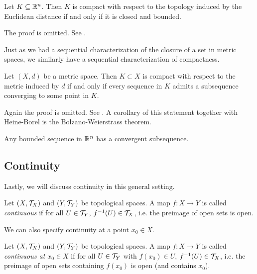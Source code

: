 \documentclass{article}
\begin{document}
\begin{theorem}
Let $K\subseteq {\mathbb{R}}^n$. Then $K$ is compact with respect to the topology induced by the Euclidean distance if and only if it is closed and bounded.
\end{theorem}

The proof is omitted. See \cite[Corollary 2.5.12]{tastetopology}.

Just as we had a sequential characterization of the closure of a set in metric spaces, we similarly have a sequential characterization of compactness. 

\begin{theorem}
Let $(X,d)$ be a metric space. Then $K\subset X$ is compact with respect to the metric induced by $d$ if and only if every sequence in $K$ admits a subsequence converging to some point in $K$.
\end{theorem}

Again the proof is omitted. See \cite[Theorem 2.5.10]{tastetopology}. A corollary of this statement together with Heine-Borel is the Bolzano-Weierstrass theorem.

\begin{corollary}
Any bounded sequence in ${\mathbb{R}}^n$ has a convergent subsequence.
\end{corollary}

\subsection{Continuity}

Lastly, we will discuss continuity in this general setting. 

\begin{definition}
Let $(X,\mathcal{T}_X)$ and $(Y,\mathcal{T}_Y)$ be topological spaces. A map $f\colon X \to Y$ is called \emph{continuous} if for all $U\in \mathcal{T}_Y$, $f^{-1}(U)\in \mathcal{T}_X$, i.e. the preimage of open sets is open. 
\end{definition}

We can also specify continuity at a point $x_0\in X$.

\begin{definition}
Let $(X,\mathcal{T}_X)$ and $(Y,\mathcal{T}_Y)$ be topological spaces. A map $f\colon X \to Y$ is called \emph{continuous at $x_0\in X$} if for all $U\in \mathcal{T}_Y$ with $f(x_0)\in U$, $f^{-1}(U)\in \mathcal{T}_X$, i.e. the preimage of open sets containing $f(x_0)$ is open (and contains $x_0$).
\end{definition}
\end{document}
